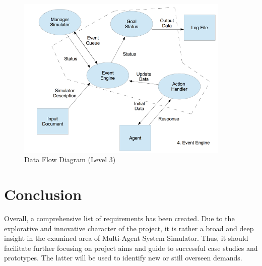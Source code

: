 \documentclass{article}
\begin{document}
\begin{figure}[!]
\centering
\includegraphics[width=4.0in]{fig6}
\caption{Data Flow Diagram (Level 3)}
\label{fig_sim}
\end{figure}


\newpage 
\section{Conclusion}
Overall, a comprehensive list of requirements has been created. Due to the explorative and innovative character of the project, it is rather a broad and deep insight in the examined area of Multi-Agent System Simulator. Thus, it should facilitate further focusing on project aims and guide to successful case studies and prototypes. The latter will be used to identify new or still overseen demands.
\end{document}
